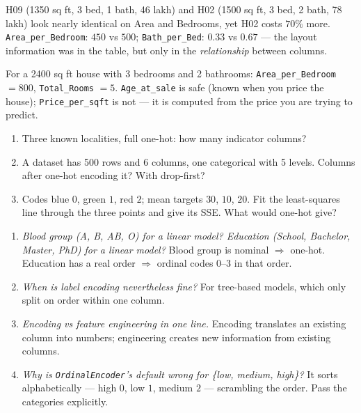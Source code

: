 \documentclass[11pt]{article}
\begin{document}
\begin{worked}
H09 (1350 sq ft, 3 bed, 1 bath, 46 lakh) and H02 (1500 sq ft, 3 bed,
2 bath, 78 lakh) look nearly identical on Area and Bedrooms, yet H02 costs
$70\%$ more. \texttt{Area\_per\_Bedroom}: $450$ vs $500$;
\texttt{Bath\_per\_Bed}: $0.33$ vs $0.67$ --- the layout information was in
the table, but only in the \emph{relationship} between columns.

For a 2400 sq ft house with 3 bedrooms and 2 bathrooms:
\texttt{Area\_per\_Bedroom} $= 800$, \texttt{Total\_Rooms} $= 5$.
\texttt{Age\_at\_sale} is safe (known when you price the house);
\texttt{Price\_per\_sqft} is not --- it is computed from the price you are
trying to predict.
\end{worked}

\begin{tryit}
\begin{enumerate}[label=\textbf{E12.\arabic*}]
  \item Three known localities, full one-hot: how many indicator columns?
  \item A dataset has 500 rows and 6 columns, one categorical with 5 levels.
    Columns after one-hot encoding it? With drop-first?
  \item Codes blue $0$, green $1$, red $2$; mean targets $30$, $10$, $20$. Fit
    the least-squares line through the three points and give its SSE. What
    would one-hot give?
\end{enumerate}
\end{tryit}

\begin{concept}
\begin{enumerate}[label=\textbf{C12.\arabic*}]
  \item \emph{Blood group (A, B, AB, O) for a linear model? Education
    (School, Bachelor, Master, PhD) for a linear model?} Blood group is
    nominal $\Rightarrow$ one-hot. Education has a real order $\Rightarrow$
    ordinal codes $0$--$3$ in that order.
  \item \emph{When is label encoding nevertheless fine?} For tree-based models,
    which only split on order within one column.
  \item \emph{Encoding vs feature engineering in one line.} Encoding
    translates an existing column into numbers; engineering creates new
    information from existing columns.
  \item \emph{Why is \texttt{OrdinalEncoder}'s default wrong for \{low, medium,
    high\}?} It sorts alphabetically --- high $0$, low $1$, medium $2$ ---
    scrambling the order. Pass the categories explicitly.
\end{enumerate}
\end{concept}
\end{document}
